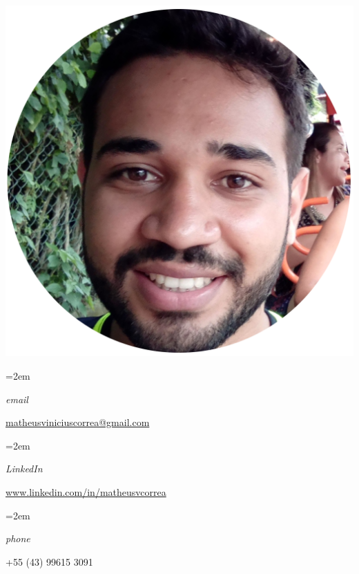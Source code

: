 \documentclass[fontsize=14pt,paper=a4]{scrartcl}
\date{} %
\newcommand{\ProfileInfo}[2]{\noindent\hangindent=2em\hangafter=0
  \parbox{5em}{\small \textit{#1}\hspace{1em}} {\small #2}}
\begin{document}
\pagestyle{scrheadings}


\begin{cv}{%
    \noindent%
    \begin{minipage}{.68\textwidth}%
    \end{minipage}%
    \hfill%
    \begin{minipage}{.30\textwidth}%
      \begin{flushright}%
        \includegraphics[clip,width=0.6\linewidth]{profile-pic-croped}
      \end{flushright}%
    \end{minipage}%
  }\vspace{-.7em}
  
  
  \vspace{.5em}
  
  \ProfileInfo{email}{\href{mailto:matheusviniciuscorrea@gmail.com}{matheusviniciuscorrea@gmail.com}}

  \ProfileInfo{LinkedIn}{\href{https://www.linkeding.com/in/matheusvcorrea}{www.linkedin.com/in/matheusvcorrea}}

  \ProfileInfo{phone}{+55 (43) 99615 3091}
  

\end{cv}
\end{document}
